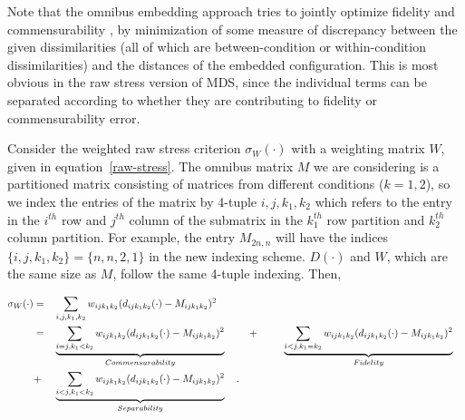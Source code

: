 \documentclass[11pt]{article} %
\begin{document}
Note that the omnibus embedding approach tries to jointly optimize fidelity and commensurability , by minimization of some measure of discrepancy between the given dissimilarities (all of which are between-condition or within-condition dissimilarities) and the distances of the embedded configuration. This is most obvious in the  raw stress version of  MDS, since the individual terms can be separated according to whether they are contributing to  fidelity or  commensurability  error.

 Consider the weighted raw stress criterion $\sigma_{W}(\cdot)$ with a weighting matrix $W$, given in equation~\eqref{raw-stress}.
 The omnibus matrix $M$ we are considering is a partitioned matrix consisting of matrices from different conditions ($k={1,2}$), so we index the entries of the matrix  by 4-tuple ${i,j,k_1,k_2}$ which refers to the entry in the $i^{th}$ row and $j^{th}$ column of the submatrix in  the $k_1^{th}$  row partition and   $k_2^{th}$ column partition. For example, the entry ${M}_{2n,n}$ will have the indices $\{i,j,k_1,k_2\}=\{n,n,2,1\}$ in the new indexing scheme. $D(\cdot)$ and $W$, which are the same size as $M$, follow the same 4-tuple indexing. Then,
 
\begin{align}
\sigma_W(\cdot)  &= & &\sum_{i,j,k_1,k_2} {w_{ij{k_1}{k_2}}(d_{ij{k_1}{k_2}}(\cdot)-M_{ijk_1k_2})^2 } \notag\\
\hspace{3pt} &=& &\underbrace{\sum_{i=j,k_1<k_2}  {w_{ij{k_1}{k_2}}(d_{ij{k_1}{k_2}}(\cdot)-M_{ijk_1k_2})^2}}_{Commensurability}  \hspace{10pt}  &  + &\hspace{2.5em} \underbrace{\sum_{i<j,k_1=k_2}  {w_{ij{k_1}{k_2}}(d_{ij{k_1}{k_2}}(\cdot)-M_{ijk_1k_2})^2  }  } _{Fidelity}\notag\\
\hspace{3pt}&+&  &\underbrace{\sum_{i< j,k_1<k_2}  {w_{ij{k_1}{k_2}}(d_{ij{k_1}{k_2}}(\cdot)-M_{ijk_1k_2})^2  }  } _{Separability}\label{eq:FidCommSep}\hspace{10pt} .
\end{align}

\end{document}
